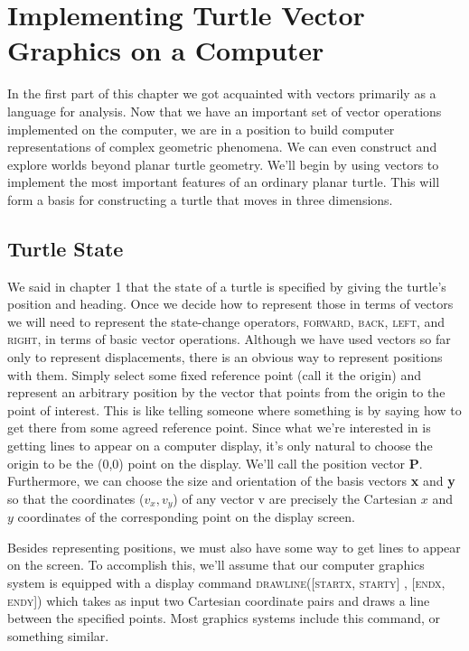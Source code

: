 \documentclass{book}
\begin{document}
\section{Implementing Turtle Vector Graphics on a Computer}

In the first part of this chapter we got acquainted with vectors primarily
as a language for analysis. Now that we have an important set of vector
operations implemented on the computer, we are in a position to build
computer representations of complex geometric phenomena. We can
even construct and explore worlds beyond planar turtle geometry.
We'll begin by using vectors to implement the most important features
of an ordinary planar turtle. This will form a basis for constructing a
turtle that moves in three dimensions.

\subsection{Turtle State}

We said in chapter 1 that the state of a turtle is specified by giving the
turtle's position and heading. Once we decide how to represent those
in terms of vectors we will need to represent the state-change operators,
\textsc{forward}, \textsc{back}, \textsc{left}, and \textsc{right}, in terms of basic vector operations.
Although we have used vectors so far only to represent displacements,
there is an obvious way to represent positions with them. Simply select
some fixed reference point (call it the origin) and represent an arbitrary
position by the vector that points from the origin to the point of interest.
This is like telling someone where something is by saying how to get
there from some agreed reference point. Since what we're interested in
is getting lines to appear on a computer display, it's only natural to
choose the origin to be the (0,0) point on the display. We'll call the
position vector \textbf{P}. Furthermore, we can choose the size and orientation
of the basis vectors \textbf{x} and \textbf{y} so that the coordinates ($v_x, v_y$) of any vector
v are precisely the Cartesian $x$ and $y$ coordinates of the corresponding
point on the display screen.

Besides representing positions, we must also have some way to get
lines to appear on the screen. To accomplish this, we'll assume that our
computer graphics system is equipped with a display command \textsc{drawline([startx, starty] , [endx, endy])} 
 which takes as input two Cartesian coordinate pairs and draws a line
between the specified points. Most graphics systems include this command, or something similar.
\end{document}
